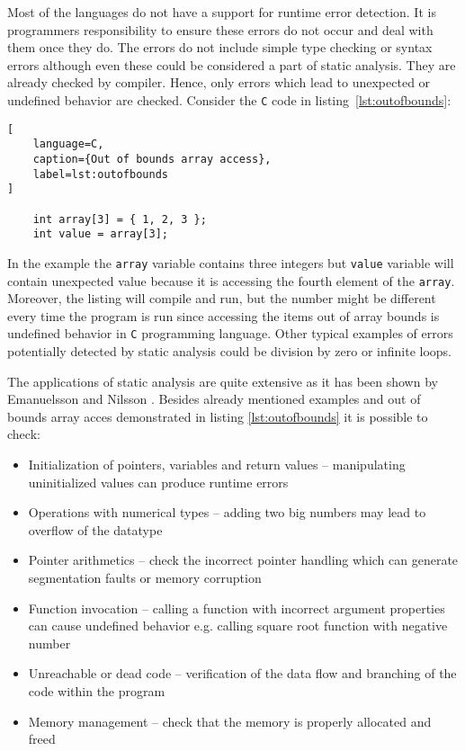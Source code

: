 \documentclass[12pt,final,oneside]{fithesis2}
\theoremstyle{definition}
\begin{document}
Most of the languages do not have a support for runtime error detection.
It is programmers responsibility to ensure these errors do not occur
and deal with them once they do. The errors do not include simple type
checking or syntax errors although even these could be considered a part
of static analysis. They are already checked by compiler. Hence, only
errors which lead to unexpected or undefined behavior are checked.
Consider the \texttt{C} code in listing~\ref{lst:outofbounds}:

\begin{lstlisting}[
    language=C,
    caption={Out of bounds array access},
    label=lst:outofbounds
]

    int array[3] = { 1, 2, 3 };
    int value = array[3];

\end{lstlisting}

In the example the \texttt{array} variable contains three integers but
\texttt{value} variable will contain unexpected value because it is
accessing the fourth element of the \texttt{array}. Moreover, the
listing will compile and run, but the number might be different every
time the program is run since accessing the items out of array bounds is
undefined behavior in \texttt{C} programming language. Other typical
examples of errors potentially detected by static analysis could be
division by zero or infinite loops.

The applications of static analysis are quite extensive as it has been
shown by Emanuelsson and Nilsson \cite{EmanuelssonNilsson08-1}. Besides
already mentioned examples and out of bounds array acces demonstrated in
listing \ref{lst:outofbounds} it is possible to check:

\begin{itemize}

\item Initialization of pointers, variables and return values --
manipulating uninitialized values can produce runtime errors

\item Operations with numerical types -- adding two big numbers may lead
to overflow of the datatype

\item Pointer arithmetics -- check the incorrect pointer handling which
can generate segmentation faults or memory corruption

\item Function invocation -- calling a function with incorrect argument
properties can cause undefined behavior e.g. calling square root
function with negative number

\item Unreachable or dead code -- verification of the data flow and
branching of the code within the program

\item Memory management -- check that the memory is properly allocated and
freed

\end{itemize}
\end{document}
